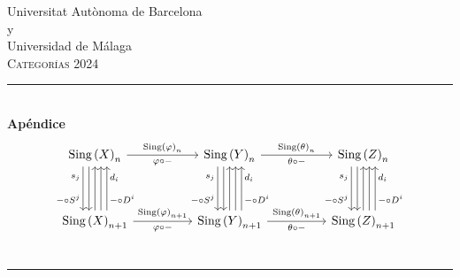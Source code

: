 \documentclass[12pt, a4paper]{article}
\begin{document}
\begin{titlepage}
\center
\vspace*{\fill}

\Large Universitat Aut\`onoma de Barcelona\\%
\Large y\\
\Large Universidad de Málaga\\[1.5cm] %
\textsc{\Large Categorías 2024}\\[0.5cm] %

\rule{\linewidth}{0.5mm} \\[0.4cm]
{ \huge \bfseries Apéndice}\\[-0.8cm]
\[
\begin{tikzcd}
\sing{X}_n \arrow[dd,shift right=2] \arrow[dd,shift right=4,"s_j"'near start,"-\circ S^j"' near end] \arrow[rr,"\sing{\varphi}_{n}","\varphi \circ -"swap]  & & 
\sing{Y}_n \arrow[dd,shift right=2] \arrow[dd,shift right=4,"s_j"'near start,"-\circ S^j"' near end] \arrow[rr,"\sing{\theta}_{n}","\theta \circ -" swap] & & 
\sing{Z}_n \arrow[dd,shift right=2] \arrow[dd,shift right=4,"s_j"'near start,"-\circ S^j"' near end] \\ 
\\
\sing{X}_{n+1} \arrow[uu] \arrow[uu, shift right=2] \arrow[uu, shift right=4,"d_i"'near end,"-\circ D^i"' near start] \arrow[rr,"\sing{\varphi}_{n+1}","\varphi \circ -"swap] & &
\sing{Y}_{n+1} \arrow[uu] \arrow[uu, shift right=2] \arrow[uu, shift right=4,"d_i"'near end,"-\circ D^i"' near start] \arrow[rr,"\sing{\theta}_{n+1}","\theta \circ -" swap] & &
\sing{Z}_{n+1} \arrow[uu] \arrow[uu, shift right=2] \arrow[uu, shift right=4,"d_i"'near end,"-\circ D^i"' near start] \\
\end{tikzcd}
\]
\rule{\linewidth}{0.5mm} \\[1.5cm]

 



\vspace*{\fill}


\end{titlepage}
\end{document}
